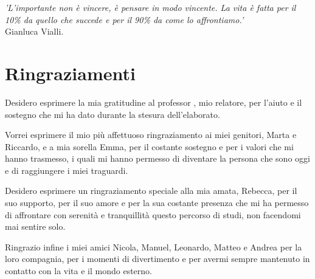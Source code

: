 \cleardoublepage
{}
\blankpage
{}

\begin{flushright}{
        \slshape
        'L'importante non è vincere, è pensare in modo vincente. La vita è fatta per il 10\% da quello che succede e per il 90\% da come lo affrontiamo.'} \\
    \medskip
    Gianluca Vialli.
\end{flushright}

\begingroup
\let\clearpage\relax
\let\cleardoublepage\relax
\let\cleardoublepage\relax

\chapter*{Ringraziamenti}

\noindent Desidero esprimere la mia gratitudine al professor \myProf, mio relatore, per l'aiuto e il sostegno che mi ha dato durante la stesura dell'elaborato.

\vspace{0.35cm}

\noindent Vorrei esprimere il mio più affettuoso ringraziamento ai miei genitori, Marta e Riccardo, e a mia sorella Emma, per il costante sostegno e
per i valori che mi hanno trasmesso, i quali mi hanno permesso di diventare la persona che sono oggi e di raggiungere i miei traguardi.

\vspace{0.35cm}

\noindent Desidero esprimere un ringraziamento speciale alla mia amata, Rebecca, per il suo supporto, per il suo amore e per la sua costante presenza che mi ha permesso di
affrontare con serenità e tranquillità questo percorso di studi, non facendomi mai sentire solo.

\vspace{0.35cm}

\noindent Ringrazio infine i miei amici Nicola, Manuel, Leonardo, Matteo e Andrea per la loro compagnia, per i momenti di divertimento e per avermi sempre mantenuto in
contatto con la vita e il mondo esterno.

\vspace{0.75cm}

\noindent{\myLocation, \myTime}
\hfill \textit{\myName}

\endgroup
